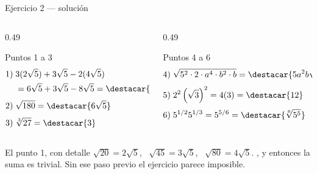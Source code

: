 \documentclass[aspectratio=169,10pt]{beamer}
\begin{document}
\begin{frame}{Ejercicio 2 — solución}
  \tiny
  \begin{columns}[T,onlytextwidth]
    \begin{column}{0.49\textwidth}
      \begin{block}{Puntos 1 a 3}
        \tiny
        \begin{align*}
          1)\;& 3(2\sqrt5) + 3\sqrt5 - 2(4\sqrt5) \\
              &= 6\sqrt5 + 3\sqrt5 - 8\sqrt5 = \destacar{\sqrt5} \\[0.3em]
          2)\;& \sqrt{180} = \destacar{6\sqrt{5}} \\[0.3em]
          3)\;& \sqrt[3]{27} = \destacar{3}
        \end{align*}
      \end{block}
    \end{column}
    \begin{column}{0.49\textwidth}
      \begin{block}{Puntos 4 a 6}
        \tiny
        \begin{align*}
          4)\;& \sqrt{5^{2}\cdot 2\cdot a^{4}\cdot b^{2}\cdot b}
                = \destacar{5a^{2}b\sqrt{2b}} \\[0.3em]
          5)\;& 2^{2}\left(\sqrt3\right)^{2} = 4(3) = \destacar{12} \\[0.3em]
          6)\;& 5^{1/2}5^{1/3} = 5^{5/6} = \destacar{\sqrt[6]{5^{5}}}
        \end{align*}
      \end{block}
    \end{column}
  \end{columns}

  \vspace{0.1cm}
  \begin{alertblock}{El punto 1, con detalle}
    \tiny
    $\sqrt{20}=2\sqrt5$, \ $\sqrt{45}=3\sqrt5$, \ $\sqrt{80}=4\sqrt5$.
    , y
    entonces la suma es trivial. Sin ese paso previo el ejercicio parece
    imposible.
  \end{alertblock}
\end{frame}
\end{document}
